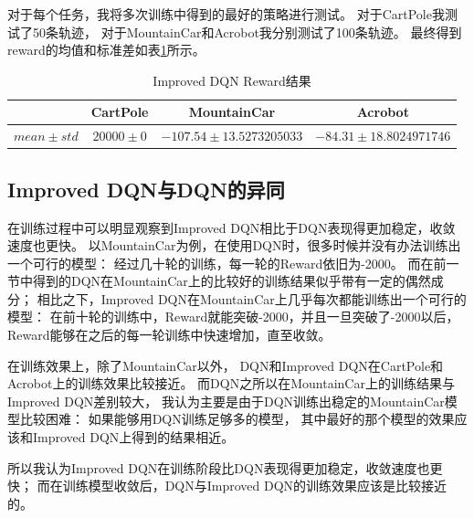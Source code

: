 \documentclass[a4paper,UTF8]{article}
\theoremstyle{definition}
\begin{document}
对于每个任务，我将多次训练中得到的最好的策略进行测试。
对于CartPole我测试了50条轨迹，
对于MountainCar和Acrobot我分别测试了100条轨迹。
最终得到reward的均值和标准差如表\ref{tab:reward-idqn}所示。

\begin{table}[H]
	\centering
	\caption{Improved DQN Reward结果}\label{tab:reward-idqn}
	\begin{tabular}{c|ccc}
		\toprule
		& CartPole & MountainCar & Acrobot \\
		\midrule
		$mean \pm std$ & $20000 \pm 0$ & $-107.54 \pm 13.5273205033$ & $-84.31 \pm 18.8024971746$ \\
		\bottomrule
	\end{tabular}
\end{table}

\subsection*{Improved DQN与DQN的异同}

在训练过程中可以明显观察到Improved DQN相比于DQN表现得更加稳定，收敛速度也更快。
以MountainCar为例，在使用DQN时，很多时候并没有办法训练出一个可行的模型：
经过几十轮的训练，每一轮的Reward依旧为-2000。
而在前一节中得到的DQN在MountainCar上的比较好的训练结果似乎带有一定的偶然成分；
相比之下，Improved DQN在MountainCar上几乎每次都能训练出一个可行的模型：
在前十轮的训练中，Reward就能突破-2000，并且一旦突破了-2000以后，
Reward能够在之后的每一轮训练中快速增加，直至收敛。

在训练效果上，除了MountainCar以外，
DQN和Improved DQN在CartPole和Acrobot上的训练效果比较接近。
而DQN之所以在MountainCar上的训练结果与Improved DQN差别较大，
我认为主要是由于DQN训练出稳定的MountainCar模型比较困难：
如果能够用DQN训练足够多的模型，
其中最好的那个模型的效果应该和Improved DQN上得到的结果相近。

所以我认为Improved DQN在训练阶段比DQN表现得更加稳定，收敛速度也更快；
而在训练模型收敛后，DQN与Improved DQN的训练效果应该是比较接近的。
\end{document}

